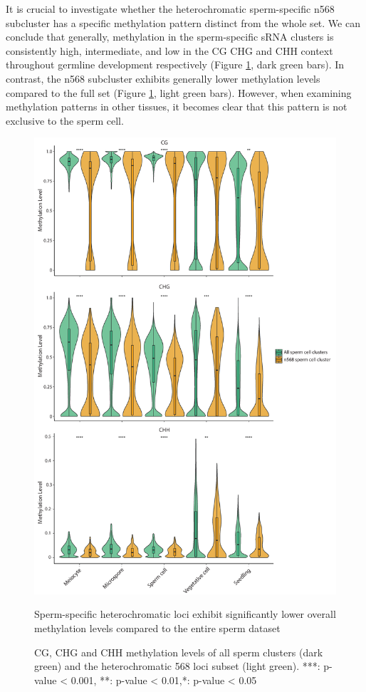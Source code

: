 It is crucial to investigate whether the heterochromatic sperm-specific n568 subcluster has a specific methylation pattern distinct from the whole set. We can conclude that generally, methylation in the sperm-specific sRNA clusters is consistently high, intermediate, and low in the CG CHG and CHH context throughout germline development respectively (Figure \ref{fig:SC_hetero_clusters}, dark green bars). In contrast, the n568 subcluster exhibits generally lower methylation levels compared to the full set (Figure \ref{fig:SC_hetero_clusters}, light green bars). However, when examining methylation patterns in other tissues, it becomes clear that this pattern is not exclusive to the sperm cell.

\begin{figure}[htbp!] 
\centering    
    \includegraphics[width=1\textwidth]{Chapter2/Figs/Figure10_SC_hetero_clusters_methylation.pdf}
\caption{Sperm-specific heterochromatic loci exhibit significantly lower overall methylation levels compared to the entire sperm dataset}
\label{fig:SC_hetero_clusters}
\captionsetup{font=small}
    \caption*{CG, CHG and CHH methylation levels of all sperm clusters (dark green) and the heterochromatic 568 loci subset (light green). ***: p-value < 0.001, **: p-value < 0.01,*: p-value < 0.05}
\end{figure}

